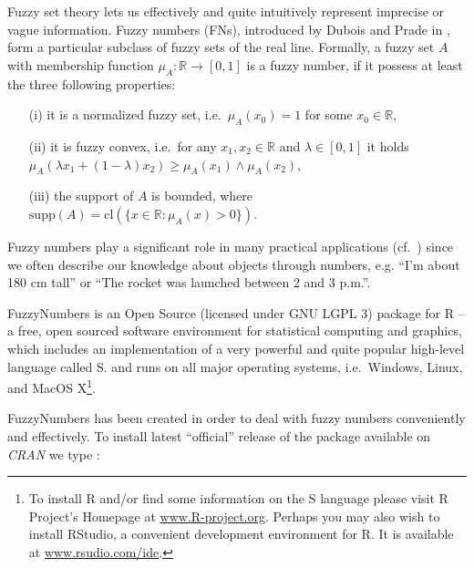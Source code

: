 \documentclass[11pt]{article}\usepackage{graphicx, color}
\newcommand{\package}[1]{\textsf{#1}\xspace}
\newcommand{\program}[1]{\textsf{#1}\xspace}
\newcommand{\os}[1]{\textsf{#1}\xspace}
\newcommand{\lang}[1]{\textsf{#1}\xspace}
\newcommand{\R}{\lang{R}}
\newif\ifDevelopmentVersion
\begin{document}
Fuzzy set theory lets us effectively and quite intuitively represent
imprecise or vague information. Fuzzy numbers (FNs), introduced
by Dubois and Prade in \cite{DuboisPrade1978:opfn}, form a particular
subclass of fuzzy sets of the real line.
Formally, a fuzzy set $A$
with membership function $\mu_A:\mathbb{R}\to[0,1]$
is a fuzzy number, if it possess at least the three following properties:
\begin{itemize}
\item[(i)] it is a normalized fuzzy set,
i.e.~$\mu_A(x_0)=1$ for some $x_0\in\mathbb{R}$,
\item[(ii)] it is fuzzy convex, i.e.~for any $x_1,x_2\in\mathbb{R}$
and $\lambda\in[0,1]$ it holds
$\mu_A(\lambda x_1 + (1-\lambda) x_2) \ge \mu_A(x_1)\wedge \mu_A(x_2)$,
\item[(iii)] the support of $A$ is bounded,
where $\mathrm{supp}(A) = \mathrm{cl}(\{x\in\mathbb{R}: \mu_A(x)>0\})$.
\end{itemize}
Fuzzy numbers play a significant role
in many practical applications
(cf.~\cite{KlirYuan1995:fuzzybook})
since we often describe our knowledge about objects
through numbers, e.g. ``I'm about 180 cm tall''
or ``The rocket was launched between 2 and 3 p.m.''.




\bigskip
\package{FuzzyNumbers} is an Open Source (licensed under GNU LGPL 3)
package for \R{} -- a free, open sourced software environment
for statistical computing and graphics, which
includes an implementation
of a very powerful and quite popular high-level language called \lang{S}.
and runs on all major operating systems, i.e.~\os{Windows},
\os{Linux}, and \os{MacOS X}\footnote{%
To install \R and/or find some information on the \lang{S} language
please visit \R Project's Homepage at \href{http://www.R-project.org}{www.R-project.org}.
Perhaps you may also wish to install  \program{RStudio},
a convenient development environment for \R.
It is available at \href{http://www.rstudio.com/ide/}{www.rsudio.com/ide}.}.


\package{FuzzyNumbers} has been created in order to deal with fuzzy numbers
conveniently and effectively.
To install latest ``official'' release of the 
package available on \textit{CRAN} we type%
\ifDevelopmentVersion%
\footnote{You are viewing the \textbf{development} version of the tutorial.
Some of the features presented in this document may be missing
in the CRAN release. Please, upgrade to the \textbf{latest} development version from
\href{https://github.com/Rexamine/FuzzyNumbers}{\textit{GitHub}}
if you need the new functionality.}\ignorespaces
\fi%
:
\end{document}
